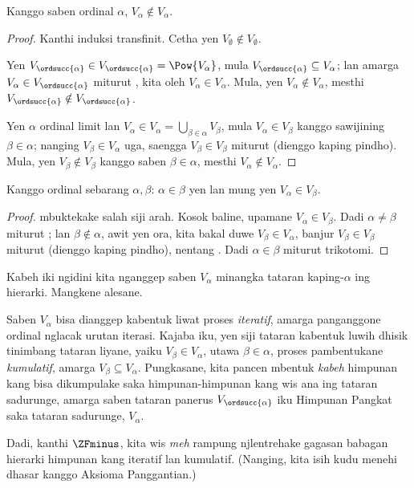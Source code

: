 \documentclass[../../../include/open-logic-section]{subfiles}
\begin{document}
\begin{lem}
Kanggo saben ordinal $\alpha$, $V_\alpha \notin V_\alpha$.
\end{lem}

\begin{proof}
Kanthi induksi transfinit. Cetha yen
$V_\emptyset \notin V_\emptyset$.

Yen $V_{\ordsucc{\alpha}} \in V_{\ordsucc{\alpha}} =
\Pow{V_\alpha}$, mula
$V_{\ordsucc{\alpha}} \subseteq V_\alpha$;
lan amarga $V_\alpha \in V_{\ordsucc{\alpha}}$
miturut , kita oleh
$V_\alpha \in V_\alpha$. Mula, yen
$V_\alpha \notin V_\alpha$, mesthi
$V_{\ordsucc{\alpha}} \notin V_{\ordsucc{\alpha}}$.

Yen $\alpha$ ordinal limit lan
$V_\alpha \in V_\alpha = \bigcup_{\beta \in
\alpha}V_\beta$, mula $V_\alpha \in V_\beta$
kanggo sawijining $\beta \in \alpha$; nanging
$V_\beta \in V_\alpha$ uga, saengga
$V_\beta \in V_\beta$ miturut
 (dienggo kaping pindho).
Mula, yen $V_\beta \notin V_\beta$ kanggo saben
$\beta \in \alpha$, mesthi
$V_\alpha \notin V_\alpha$.
\end{proof}

\begin{cor}
Kanggo ordinal sebarang $\alpha, \beta$:
$\alpha \in \beta$ yen lan mung yen
$V_\alpha \in V_\beta$.
\end{cor}

\begin{proof}
 mbuktekake salah siji
arah. Kosok baline, upamane $V_\alpha \in V_\beta$.
Dadi $\alpha \neq \beta$ miturut
;
lan $\beta \notin \alpha$, awit yen ora,
kita bakal duwe $V_\beta \in V_\alpha$,
banjur $V_\beta \in V_\beta$ miturut
 (dienggo kaping pindho),
nentang .
Dadi $\alpha \in \beta$ miturut trikotomi.
\end{proof}
\noindent
Kabeh iki ngidini kita nganggep saben $V_\alpha$
minangka tataran kaping-$\alpha$ ing hierarki.
Mangkene alesane.

Saben $V_\alpha$ bisa dianggep kabentuk liwat
proses \emph{iteratif}, amarga panganggone ordinal
nglacak urutan iterasi. Kajaba iku, yen siji
tataran kabentuk luwih dhisik tinimbang tataran
liyane, yaiku $V_\beta \in V_\alpha$, utawa
$\beta \in \alpha$, proses pambentukane
\emph{kumulatif}, amarga
$V_\beta \subseteq V_\alpha$. Pungkasane,
kita pancen mbentuk \emph{kabeh} himpunan kang
bisa dikumpulake saka himpunan-himpunan kang wis
ana ing tataran sadurunge, amarga saben tataran
panerus $V_{\ordsucc{\alpha}}$ iku Himpunan
Pangkat saka tataran sadurunge, $V_\alpha$.

Dadi, kanthi $\ZFminus$, kita wis
\emph{meh} rampung njlentrehake gagasan babagan
hierarki himpunan kang iteratif lan kumulatif.
(Nanging, kita isih kudu menehi dhasar kanggo
Aksioma Panggantian.)
\end{document}
